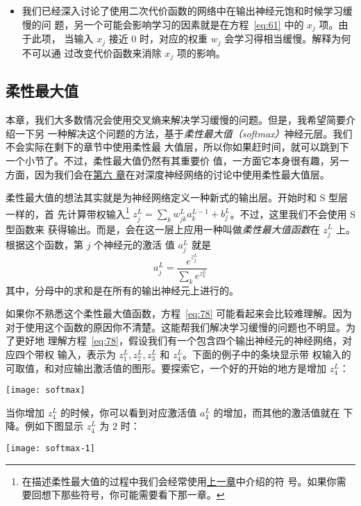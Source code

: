 \begin{itemize}
\item 我们已经深入讨论了使用二次代价函数的网络中在输出神经元饱和时候学习缓慢的问
  题，另一个可能会影响学习的因素就是在方程~\eqref{eq:61} 中的 $x_j$ 项。由于此项，
  当输入 $x_j$ 接近 $0$ 时，对应的权重 $w_j$ 会学习得相当缓慢。解释为何不可以通
  过改变代价函数来消除 $x_j$ 项的影响。
\end{itemize}

\subsection{柔性最大值}
\label{subsec:softmax}

本章，我们大多数情况会使用交叉熵来解决学习缓慢的问题。但是，我希望简要介绍一下另
一种解决这个问题的方法，基于\emph{柔性最大值（softmax）}神经元层。我们不会实际在剩下的章节中使用柔性最
大值层，所以你如果赶时间，就可以跳到下一个小节了。不过，柔性最大值仍然有其重要价
值，一方面它本身很有趣，另一方面，因为我们会在\hyperref[ch:Deeplearning]{第六
  章}在对深度神经网络的讨论中使用柔性最大值层。

柔性最大值的想法其实就是为神经网络定义一种新式的输出层。开始时和 S 型层一样的，首
先计算带权输入\footnote{在描述柔性最大值的过程中我们会经常使用\hyperref[ch:HowTheBackpropagationAlgorithmWorks]{上一章}中介绍的符
  号。如果你需要回想下那些符号，你可能需要看下那一章。}
$z^L_j = \sum_{k} w^L_{jk} a^{L-1}_k + b^L_j$。不过，这里我们不会使用 S 型函数来
获得输出。而是，会在这一层上应用一种叫做\emph{柔性最大值函数}在 $z^L_j$ 上。根据这个函数，第 $j$ 个神经元的激活
值 $a^L_j$ 就是
\begin{equation}
  a^L_j = \frac{e^{z^L_j}}{\sum_k e^{z^L_k}}
  \label{eq:78}\tag{78}
\end{equation}
其中，分母中的求和是在所有的输出神经元上进行的。

如果你不熟悉这个柔性最大值函数，方程~\eqref{eq:78} 可能看起来会比较难理解。因为
对于使用这个函数的原因你不清楚。这能帮我们解决学习缓慢的问题也不明显。为了更好地
理解方程~\eqref{eq:78}，假设我们有一个包含四个输出神经元的神经网络，对应四个带权
输入，表示为 $z^L_1, z^L_2, z^L_3$ 和 $z^L_4$。下面的例子中的条块显示带
权输入的可取值，和对应输出激活值的图形。要探索它，一个好的开始的地方是增加 $z^L_4$：
\begin{center}
  \texttt{[image: softmax]}
\end{center}

当你增加 $z^L_4$ 的时候，你可以看到对应激活值 $a^L_4$ 的增加，而其他的激活值就在
下降。例如下图显示 $z^L_4$ 为 $2$ 时：
\begin{center}
  \texttt{[image: softmax-1]}
\end{center}

